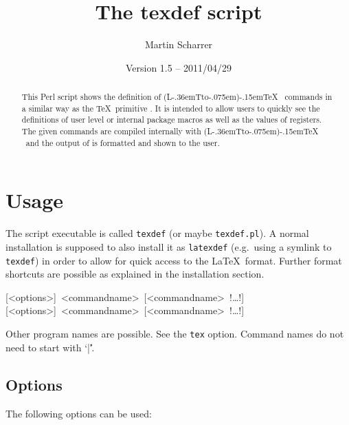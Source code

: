 \documentclass{ydoc}
\title{The \textsf{texdef} script}
\author{Martin Scharrer}
\date{Version 1.5 -- 2011/04/29}
\makeatletter
\DeclareRobustCommand{\LATeX}{%
    (L\kern -.36em{\sbox \z@ T\vbox to\ht \z@ {\hbox {\check@mathfonts \fontsize \sf@size \z@ \math@fontsfalse \selectfont A}\vss }}\kern -.075em)\kern -.15em\TeX
}
\makeatother
\begin{document}
\maketitle

\begin{abstract}
This Perl script shows the definition of \LATeX\ commands in a similar way as the \TeX\ primitive \Macro\show.
It is intended to allow users to quickly see the definitions of user level or internal package macros as well as the
values of registers. The given commands are compiled internally with \LATeX\ and the output of \Macro\show is formatted
and shown to the user.
\end{abstract}

\tableofcontents


\section{Usage}
The script executable is called \texttt{texdef} (or maybe \texttt{texdef.pl}).
A normal installation is supposed to also install it as \texttt{latexdef} (e.g.\ using a symlink to \texttt{texdef}) in order to 
allow for quick access to the \LaTeX\ format. Further format shortcuts are possible as explained in the installation section.

\parindent=0pt
[<options>]~<commandname>~[<commandname>~!\ldots!]
[<options>]~<commandname>~[<commandname>~!\ldots!]

Other program names are possible. See the \texttt{tex} option.  Command names do not need to start with `|\|'.

\subsection*{Options}
The following options can be used:
\par\medskip
\end{document}
